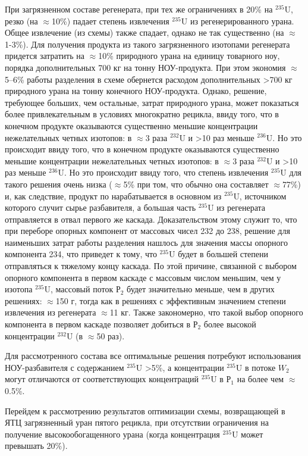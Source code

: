 При загрязненном составе регенерата, при тех же ограничениях в 20\% на $^{235}$U, резко (на $\approx$10\%) падает степень извлечения $^{235}$U из регенерированного урана. Общее извлечение (из схемы) также спадает, однако не так существенно (на $\approx$1-3\%). Для получения продукта из такого загрязненного изотопами регенерата придется затратить на $\approx$10\% природного урана на единицу товарного ноу, порядка дополнительных 700 кг на тонну НОУ-продукта. При этом экономия $\approx$5--6\% работы разделения в схеме обернется расходом дополнительных >700 кг природного урана на тонну конечного НОУ-продукта. Однако, решение, требующее больших, чем остальные, затрат природного урана, может показаться более привлекательным в условиях многократно рецикла, ввиду того, что в конечном продукте оказываются существенно меньшие концентрации нежелательных четных изотопов: в $\approx$3 раза $^{232}$U и >10 раз меньше $^{236}$U. Но это происходит ввиду того, что в конечном продукте оказываются существенно меньшие концентрации нежелательных четных изотопов: в $\approx$3 раза $^{232}$U и >10 раз меньше $^{236}$U. Но это происходит ввиду того, что степень извлечения $^{235}$U для такого решения очень низка ($\approx$5\% при том, что обычно она составляет $\approx$77\%) и, как следствие, продукт по нарабатывается в основном из $^{235}$U, источником которого случит сырье разбавителя, а большая часть $^{235}$U из регенерата отправляется в отвал первого же каскада. Доказательством этому служит то, что при переборе опорных компонент от массовых чисел 232 до 238, решение для наименьших затрат работы разделения нашлось для значения массы опорного компонента 234, что приведет к тому, что $^{235}$U будет в большей степени отправляться к тяжелому концу каскада. По этой причине, связанной с выбором опорного компонента в первом каскаде с массовым числом меньшим, чем у изотопа $^{235}$U, массовый поток $Р_2$ будет значительно меньше, чем в других решениях: $\approx$150 г, тогда как в решениях с эффективным значением степени извлечения из регенерата $\approx$11 кг. Также закономерно, что такой выбор опорного компонента в первом каскаде позволяет добиться в $Р_2$ более высокой концентрации $^{232}$U (в $\approx$50 раз).

Для рассмотренного состава все оптимальные решения потребуют использования НОУ-разбавителя с содержанием $^{235}$U >5\%, а концентрации $^{235}$U в потоке $W_2$ могут отличаются от соответствующих  концентраций $^{235}$U в $Р_1$ на более чем $\approx$0.5\%.

Перейдем к рассмотрению результатов оптимизации схемы, возвращающей в ЯТЦ загрязненный уран пятого рецикла, при отсутствии ограничения на получение высокообогащенного урана (когда концентрация $^{235}$U может превышать 20\%).

